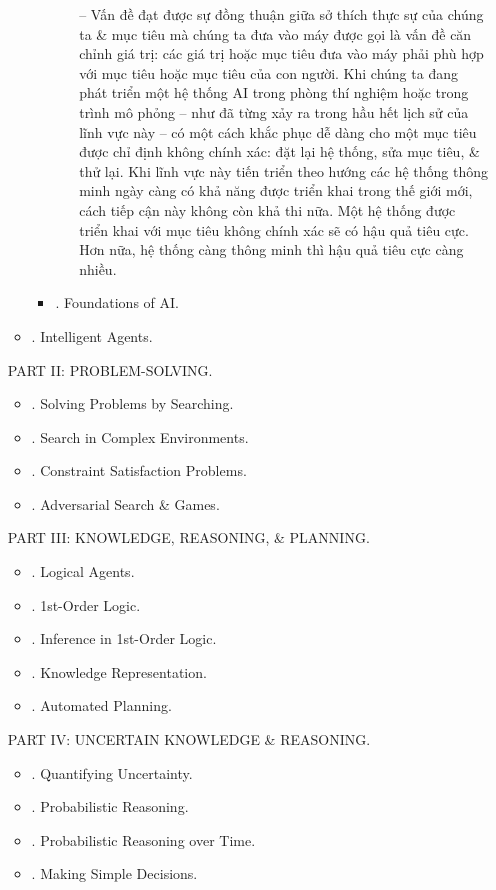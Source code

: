 \documentclass{article}
\begin{document}
\begin{itemize}
\begin{itemize}
\begin{itemize}
\begin{itemize}
				-- Vấn đề đạt được sự đồng thuận giữa sở thích thực sự của chúng ta \& mục tiêu mà chúng ta đưa vào máy được gọi là vấn đề căn chỉnh giá trị: các giá trị hoặc mục tiêu đưa vào máy phải phù hợp với mục tiêu hoặc mục tiêu của con người. Khi chúng ta đang phát triển một hệ thống AI trong phòng thí nghiệm hoặc trong trình mô phỏng -- như đã từng xảy ra trong hầu hết lịch sử của lĩnh vực này -- có một cách khắc phục dễ dàng cho một mục tiêu được chỉ định không chính xác: đặt lại hệ thống, sửa mục tiêu, \& thử lại. Khi lĩnh vực này tiến triển theo hướng các hệ thống thông minh ngày càng có khả năng được triển khai trong thế giới mới, cách tiếp cận này không còn khả thi nữa. Một hệ thống được triển khai với mục tiêu không chính xác sẽ có hậu quả tiêu cực. Hơn nữa, hệ thống càng thông minh thì hậu quả tiêu cực càng nhiều.
			\end{itemize}
			\item {. Foundations of AI.}
		\end{itemize}
		\item {. Intelligent Agents.}
	\end{itemize}
	PART II: PROBLEM-SOLVING.
	\begin{itemize}
		\item {. Solving Problems by Searching.}
		\item {. Search in Complex Environments.}
		\item {. Constraint Satisfaction Problems.}
		\item {. Adversarial Search \& Games.}
	\end{itemize}
	PART III: KNOWLEDGE, REASONING, \& PLANNING.
	\begin{itemize}
		\item {. Logical Agents.}
		\item {. 1st-Order Logic.}
		\item {. Inference in 1st-Order Logic.}
		\item {. Knowledge Representation.}
		\item {. Automated Planning.}
	\end{itemize}
	PART IV: UNCERTAIN KNOWLEDGE \& REASONING.
	\begin{itemize}
		\item {. Quantifying Uncertainty.}
		\item {. Probabilistic Reasoning.}
		\item {. Probabilistic Reasoning over Time.}
		\item {. Making Simple Decisions.}

\end{itemize}
\end{itemize}
\end{document}
